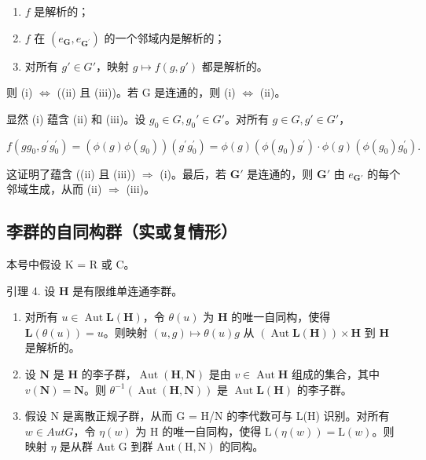 \begin{enumerate}
\def\labelenumi{(\roman{enumi})}
\item
  \(f\) 是解析的；
\item
  \(f\) 在 \((e_{\mathbf{G}}, e_{\mathbf{G}^{\prime}})\) 的一个邻域内是解析的；
\item
  对所有 \(g' \in G'\)，映射 \(g \mapsto f(g, g')\) 都是解析的。
\end{enumerate}

则 (i) \(\Leftrightarrow\) ((ii) 且 (iii))。若 G 是连通的，则 (i) \(\Leftrightarrow\) (ii)。

显然 (i) 蕴含 (ii) 和 (iii)。设 \(g_0 \in G, g_0' \in G'\)。对所有 \(g \in G, g' \in G'\)，

\[
f \left(g g _ {0}, g ^ {\prime} g _ {0} ^ {\prime}\right) = (\phi (g) \phi (g _ {0})) \left(g ^ {\prime} g _ {0} ^ {\prime}\right) = \phi (g) \left(\phi (g _ {0}) g ^ {\prime}\right)\cdot \phi (g) \left(\phi (g _ {0}) g _ {0} ^ {\prime}\right).
\]

这证明了蕴含 ((ii) 且 (iii)) \(\Rightarrow\) (i)。最后，若 \(\mathbf{G}'\) 是连通的，则 \(\mathbf{G}'\) 由 \(e_{\mathbf{G}'}\) 的每个邻域生成，从而 (ii) \(\Rightarrow\) (iii)。

\subsection{李群的自同构群（实或复情形）}

本号中假设 K = R 或 C。

引理 4. 设 \(\mathbf{H}\) 是有限维单连通李群。

\begin{enumerate}
\def\labelenumi{(\roman{enumi})}
\item
  对所有 \(u \in \operatorname{Aut} \mathbf{L}(\mathbf{H})\)，令 \(\theta(u)\) 为 \(\mathbf{H}\) 的唯一自同构，使得 \(\mathbf{L}(\theta(u)) = u\)。则映射 \((u, g) \mapsto \theta(u)g\) 从 \((\operatorname{Aut} \mathbf{L}(\mathbf{H})) \times \mathbf{H}\) 到 \(\mathbf{H}\) 是解析的。
\item
  设 \(\mathbf{N}\) 是 \(\mathbf{H}\) 的李子群，\(\operatorname{Aut}(\mathbf{H},\mathbf{N})\) 是由 \(v\in \operatorname{Aut}\mathbf{H}\) 组成的集合，其中 \(v(\mathbf{N}) = \mathbf{N}\)。则 \(\theta^{-1}(\operatorname {Aut}(\mathbf{H},\mathbf{N}))\) 是 \(\operatorname {Aut}\mathbf{L}(\mathbf{H})\) 的李子群。
\item
  假设 N 是离散正规子群，从而 G = H/N 的李代数可与 L(H) 识别。对所有 \(w \in Aut G\)，令 \(\eta(w)\) 为 H 的唯一自同构，使得 \(\mathrm{L}(\eta(w)) = \mathrm{L}(w)\)。则映射 \(\eta\) 是从群 Aut G 到群 \(\mathrm{Aut}(\mathrm{H}, \mathrm{N})\) 的同构。
\end{enumerate}

